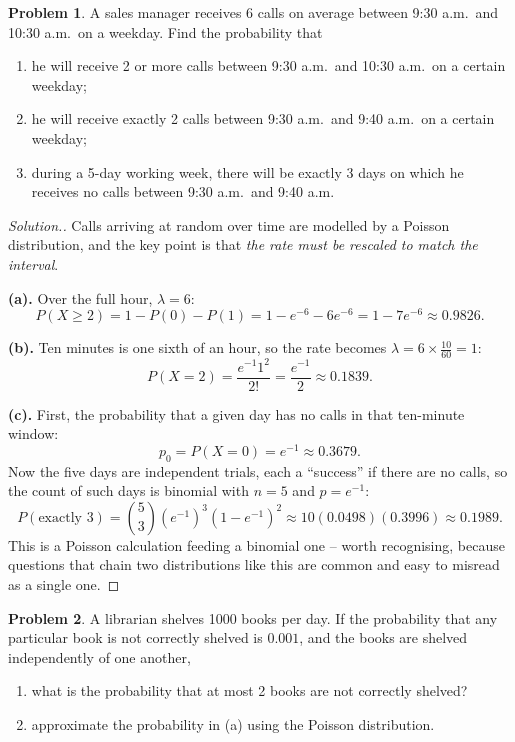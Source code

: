 \documentclass[12pt,a4paper]{report}
\theoremstyle{definition}
\theoremstyle{plain}
\theoremstyle{definition}
\newtheorem{problemx}{Problem}[section]
\newenvironment{problem}{\begin{problemx}}{\end{problemx}}
\newenvironment{solution}
  {\renewcommand{\qedsymbol}{}\begin{proof}[\textit{Solution}.]}
  {\end{proof}}
\begin{document}
\begin{problem}
A sales manager receives 6 calls on average between 9:30 a.m.\ and 10:30 a.m.\ on a
weekday. Find the probability that
\begin{enumerate}
\item[(a).] he will receive 2 or more calls between 9:30 a.m.\ and 10:30 a.m.\ on a
certain weekday;
\item[(b).] he will receive exactly 2 calls between 9:30 a.m.\ and 9:40 a.m.\ on a
certain weekday;
\item[(c).] during a 5-day working week, there will be exactly 3 days on which he
receives no calls between 9:30 a.m.\ and 9:40 a.m.
\end{enumerate}
\end{problem}

\begin{solution}
Calls arriving at random over time are modelled by a Poisson distribution, and the key
point is that \emph{the rate must be rescaled to match the interval}.

\textbf{(a).} Over the full hour, $\lambda = 6$:
\[P(X\geq 2) = 1-P(0)-P(1) = 1-e^{-6}-6e^{-6} = 1-7e^{-6} \approx 0.9826.\]

\textbf{(b).} Ten minutes is one sixth of an hour, so the rate becomes
$\lambda = 6\times\tfrac{10}{60} = 1$:
\[P(X=2) = \frac{e^{-1}1^{2}}{2!} = \frac{e^{-1}}{2} \approx 0.1839.\]

\textbf{(c).} First, the probability that a given day has no calls in that ten-minute
window:
\[p_0 = P(X=0) = e^{-1} \approx 0.3679.\]
Now the five days are independent trials, each a ``success'' if there are no calls, so
the count of such days is binomial with $n=5$ and $p = e^{-1}$:
\[P(\text{exactly }3) = \binom{5}{3}\left(e^{-1}\right)^{3}\left(1-e^{-1}\right)^{2}
 \approx 10(0.0498)(0.3996) \approx 0.1989.\]
This is a Poisson calculation feeding a binomial one -- worth recognising, because
questions that chain two distributions like this are common and easy to misread as a
single one.
\end{solution}

\begin{problem}
A librarian shelves 1000 books per day. If the probability that any particular book is
not correctly shelved is $0.001$, and the books are shelved independently of one another,
\begin{enumerate}
\item[(a).] what is the probability that at most 2 books are not correctly shelved?
\item[(b).] approximate the probability in (a) using the Poisson distribution.
\end{enumerate}
\end{problem}
\end{document}
